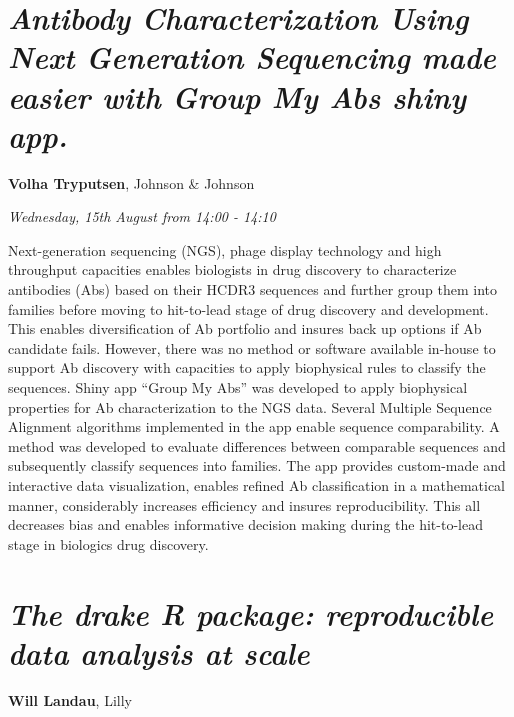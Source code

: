 \documentclass[]{book}
\theoremstyle{definition}
\theoremstyle{definition}
\theoremstyle{definition}
\theoremstyle{remark}
\begin{document}
\hypertarget{antibody-characterization-using-next-generation-sequencing-made-easier-with-group-my-abs-shiny-app.}{%
\section{\texorpdfstring{\emph{Antibody Characterization Using Next
Generation Sequencing made easier with Group My Abs shiny
app.}}{Antibody Characterization Using Next Generation Sequencing made easier with Group My Abs shiny app.}}\label{antibody-characterization-using-next-generation-sequencing-made-easier-with-group-my-abs-shiny-app.}}

\textbf{Volha Tryputsen}, Johnson \& Johnson

\emph{Wednesday, 15th August from 14:00 - 14:10}

Next-generation sequencing (NGS), phage display technology and high
throughput capacities enables biologists in drug discovery to
characterize antibodies (Abs) based on their HCDR3 sequences and further
group them into families before moving to hit-to-lead stage of drug
discovery and development. This enables diversification of Ab portfolio
and insures back up options if Ab candidate fails. However, there was no
method or software available in-house to support Ab discovery with
capacities to apply biophysical rules to classify the sequences. Shiny
app ``Group My Abs'' was developed to apply biophysical properties for
Ab characterization to the NGS data. Several Multiple Sequence Alignment
algorithms implemented in the app enable sequence comparability. A
method was developed to evaluate differences between comparable
sequences and subsequently classify sequences into families. The app
provides custom-made and interactive data visualization, enables refined
Ab classification in a mathematical manner, considerably increases
efficiency and insures reproducibility. This all decreases bias and
enables informative decision making during the hit-to-lead stage in
biologics drug discovery.

\hypertarget{the-drake-r-package-reproducible-data-analysis-at-scale}{%
\section{\texorpdfstring{\emph{The drake R package: reproducible data
analysis at
scale}}{The drake R package: reproducible data analysis at scale}}\label{the-drake-r-package-reproducible-data-analysis-at-scale}}

\textbf{Will Landau}, Lilly
\end{document}
